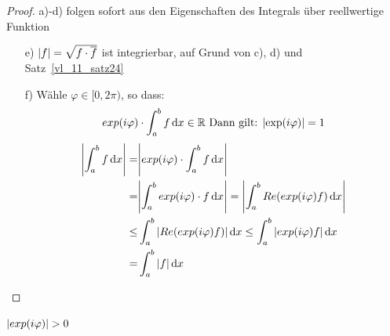 \begin{proof}
	a)-d) folgen sofort aus den Eigenschaften des Integrals über reellwertige 
	Funktion
	\begin{itemize}
		\item[e)] $\abs{f} = \sqrt{f \cdot \overline{f}}$ ist integrierbar, 
		auf Grund von c), d) und Satz~\ref{vl_11_satz24} 
		\item[f)] Wähle $\varphi \in [0, 2\pi)$, so dass:
		\begin{align*}
			exp(i \varphi) \cdot \int_a^b f \dd{x} \in \mathbb{R} \text{ Dann gilt: } \abs{\exp(i \varphi)} =1
		\end{align*}
		\begin{align*}
			\abs{\int_a^b f\dd{x} } = & \abs{exp(i \varphi) \cdot \int_a^b f \dd{x}} \\
			 = & \abs{ \int_a^b exp(i \varphi) \cdot f \dd{x}} = \abs{ \int_a^b   
			Re(exp(i \varphi) f) \dd{x}} \\
			 \leq & \int_a^b \abs{Re(exp(i \varphi) f)} \dd{x}
			\leq \int_a^b \abs{ exp(i \varphi) f } \dd{x} \\
			= & \int_a^b \abs{f} \dd{x}
		\end{align*}
	\end{itemize}
\end{proof}

\begin{Bemerkung}{
	$\abs{exp(i \varphi)} > 0$
}\end{Bemerkung}
